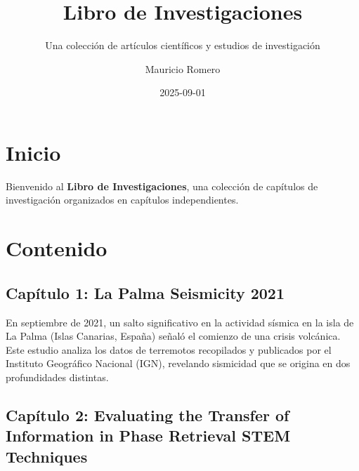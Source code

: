 \documentclass[
  spanish,
  letterpaper,
]{book}
\title{Libro de Investigaciones}
\subtitle{Una colección de artículos científicos y estudios de
investigación}
\author{Mauricio Romero}
\date{2025-09-01}
\renewcommand*\contentsname{Tabla de contenidos}
\newcommand\contentsname{Tabla de contenidos}
\begin{document}
\frontmatter
\maketitle

\renewcommand*\contentsname{Tabla de contenidos}
{
\setcounter{tocdepth}{2}
\tableofcontents
}

\mainmatter
{}

\chapter*{Inicio}\label{inicio}


Bienvenido al \textbf{Libro de Investigaciones}, una colección de
capítulos de investigación organizados en capítulos independientes.


\chapter*{Contenido}\label{contenido}


\section*{Capítulo 1: La Palma Seismicity
2021}\label{capuxedtulo-1-la-palma-seismicity-2021}


En septiembre de 2021, un salto significativo en la actividad sísmica en
la isla de La Palma (Islas Canarias, España) señaló el comienzo de una
crisis volcánica. Este estudio analiza los datos de terremotos
recopilados y publicados por el Instituto Geográfico Nacional (IGN),
revelando sismicidad que se origina en dos profundidades distintas.

\section*{Capítulo 2: Evaluating the Transfer of Information in Phase
Retrieval STEM
Techniques}\label{capuxedtulo-2-evaluating-the-transfer-of-information-in-phase-retrieval-stem-techniques}
\end{document}
